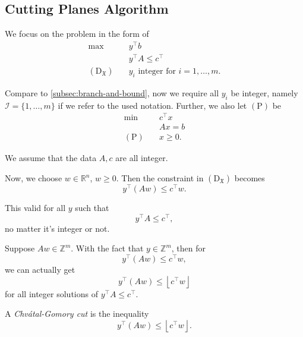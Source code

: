 \subsection{Cutting Planes Algorithm}
We focus on the problem in the form of
\[
	\begin{aligned}
		\max~                             & y^{\top}b                                  \\
		                                  & y^{\top}A\leq c^{\top}                     \\
		(\mathrm{D}_{\mathfrak{X} })\quad & y_{i}\text{ integer for }i = 1, \dots , m.
	\end{aligned}
\]
\begin{note}
	Compare to \autoref{subsec:branch-and-bound}, now we require all \(y_{i}\) be integer, namely \(\mathcal{I} = \{1, \dots , m\}\) if we refer to the used notation. Further, we also let \((\mathrm{P})\) be
	\[
		\begin{aligned}
			\min~             & c^{\top}x \\
			                  & Ax = b    \\
			(\mathrm{P})\quad & x\geq 0.
		\end{aligned}
	\]
\end{note}

\begin{remark}
	We assume that the data \(A, c\) are all integer.
\end{remark}

Now, we choose \(w\in \mathbb{R}^n\), \(w\geq 0\). Then the constraint in \((\mathrm{D}_{\mathfrak{X}})\) becomes
\[
	y^{\top}(Aw) \leq c^{\top}w.
\]

\begin{remark}
	This valid for all \(y\) such that
	\[
		y^{\top}A\leq c^{\top},
	\]
	no matter it's integer or not.
\end{remark}

Suppose \(Aw\in\mathbb{Z}^m\). With the fact that \(y\in \mathbb{Z}^m\), then for
\[
	y^{\top}(Aw)\leq c^{\top}w,
\]
we can actually get
\[
	y^{\top}(Aw)\leq \left\lfloor c^{\top}w \right\rfloor
\]
for all integer solutions of \(y^{\top} A \leq c^{\top} \).

\begin{definition}\label{def:Chvatal-Gomory-cut}
	A \emph{Chvátal-Gomory cut} is the inequality
	\[
		y^{\top}(Aw)\leq \left\lfloor c^{\top}w \right\rfloor.
	\]
\end{definition}

